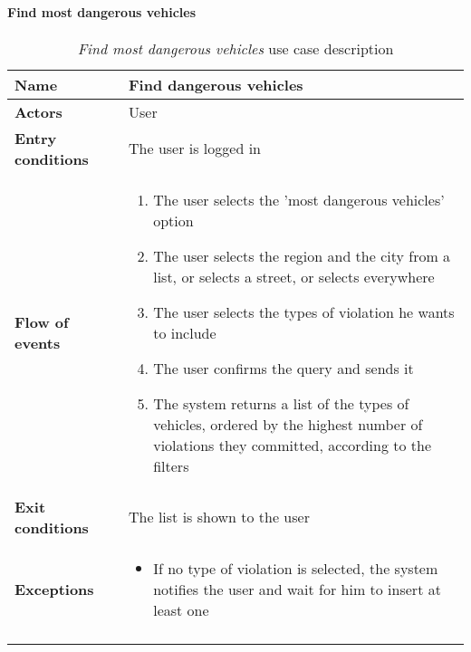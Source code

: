 		\paragraph{Find most dangerous vehicles}
		\begin{longtable}{p{0.25\linewidth}p{0.75\linewidth}}
			\toprule
			\textbf{Name} & \textbf{Find dangerous vehicles} \\
			\midrule
			\textbf{Actors} & User \\
			\midrule
			\textbf{Entry conditions} & The user is logged in \\
			\midrule
			\textbf{Flow of events} & 
			\begin{enumerate}
				\item The user selects the 'most dangerous vehicles' option
				\item The user selects the region and the city from a list, or selects a street, or selects everywhere
				\item The user selects the types of violation he wants to include
				\item The user confirms the query and sends it
				\item The system returns a list of the types of vehicles, ordered by the highest number of violations they committed, according to the filters
			\end{enumerate} \\
			\midrule
			\textbf{Exit conditions} & The list is shown to the user\\
			\midrule
			\textbf{Exceptions} & 
			\begin{itemize}
				\item 	If no type of violation is selected, the system notifies the user and wait for him to insert at least one	
			\end{itemize} \\
			\bottomrule
			\caption{\emph{Find most dangerous vehicles} use case description}
		\end{longtable}
		
